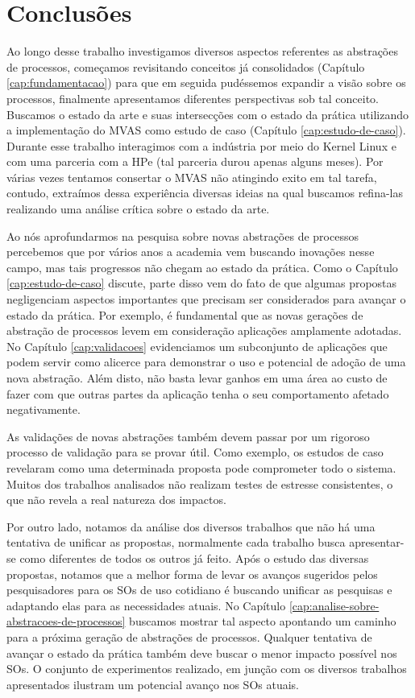 \chapter{Conclusões}
\label{cap:conclusoes}

Ao longo desse trabalho investigamos diversos aspectos referentes as abstrações
de processos, começamos revisitando conceitos já consolidados (Capítulo
\ref{cap:fundamentacao}) para que em seguida pudéssemos expandir a visão sobre
os processos, finalmente apresentamos diferentes perspectivas sob tal conceito.
Buscamos o estado da arte e suas intersecções com o estado da prática
utilizando a implementação do MVAS como estudo de caso (Capítulo
\ref{cap:estudo-de-caso}). Durante esse trabalho interagimos com a indústria
por meio do Kernel Linux e com uma parceria com a HPe (tal parceria durou
apenas alguns meses). Por várias vezes tentamos consertar o MVAS não atingindo
exito em tal tarefa, contudo, extraímos dessa experiência diversas ideias na
qual buscamos refina-las realizando uma análise crítica sobre o estado da arte.

Ao nós aprofundarmos na pesquisa sobre novas abstrações de processos percebemos
que por vários anos a academia vem buscando inovações nesse campo, mas tais
progressos não chegam ao estado da prática. Como o Capítulo
\ref{cap:estudo-de-caso} discute, parte disso vem do fato de que algumas
propostas negligenciam aspectos importantes que precisam ser considerados para
avançar o estado da prática. Por exemplo, é fundamental que as novas gerações
de abstração de processos levem em consideração aplicações amplamente adotadas.
No Capítulo \ref{cap:validacoes} evidenciamos um subconjunto de aplicações que
podem servir como alicerce para demonstrar o uso e potencial de adoção de uma
nova abstração. Além disto, não basta levar ganhos em uma área ao custo de
fazer com que outras partes da aplicação tenha o seu comportamento afetado
negativamente.

As validações de novas abstrações também devem passar por um rigoroso processo
de validação para se provar útil. Como exemplo, os estudos de caso revelaram
como uma determinada proposta pode comprometer todo o sistema. Muitos dos
trabalhos analisados não realizam testes de estresse consistentes, o que não
revela a real natureza dos impactos.

Por outro lado, notamos da análise dos diversos trabalhos que não há uma
tentativa de unificar as propostas, normalmente cada trabalho busca
apresentar-se como diferentes de todos os outros já feito. Após o estudo das
diversas propostas, notamos que a melhor forma de levar os avanços sugeridos
pelos pesquisadores para os SOs de uso cotidiano é buscando unificar as
pesquisas e adaptando elas para as necessidades atuais. No Capítulo
\ref{cap:analise-sobre-abstracoes-de-processos} buscamos mostrar tal aspecto
apontando um caminho para a próxima geração de abstrações de processos.
Qualquer tentativa de avançar o estado da prática também deve buscar o menor
impacto possível nos SOs. O conjunto de experimentos realizado, em junção com
os diversos trabalhos apresentados ilustram um potencial avanço nos SOs atuais.

